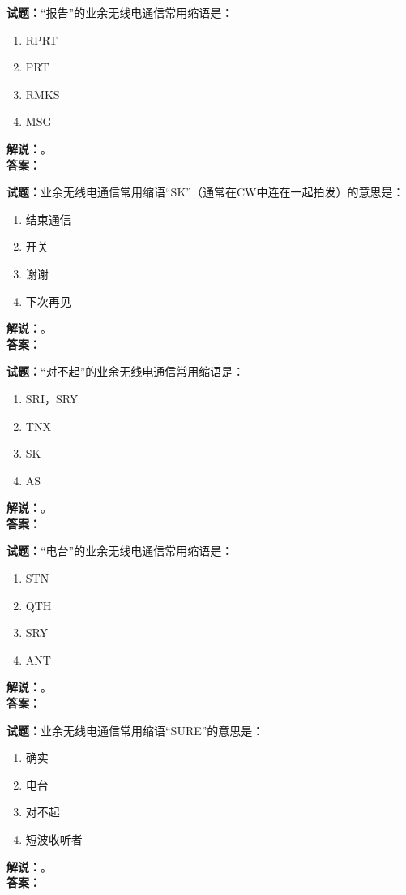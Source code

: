 \documentclass{ctexbook}
\begin{document}
\bigskip

\noindent\textbf{试题：}“报告”的业余无线电通信常用缩语是：
\begin{enumerate}[leftmargin=3em]
  \item RPRT
  \item PRT
  \item RMKS
  \item MSG
\end{enumerate}
\noindent\textbf{解说：}\textbf{}。\\\noindent\textbf{答案：}

\bigskip

\noindent\textbf{试题：}业余无线电通信常用缩语“SK”（通常在CW中连在一起拍发）的意思是：
\begin{enumerate}[leftmargin=3em]
  \item 结束通信
  \item 开关
  \item 谢谢
  \item 下次再见
\end{enumerate}
\noindent\textbf{解说：}\textbf{}。\\\noindent\textbf{答案：}

\bigskip

\noindent\textbf{试题：}“对不起”的业余无线电通信常用缩语是：
\begin{enumerate}[leftmargin=3em]
  \item SRI，SRY
  \item TNX
  \item SK
  \item AS
\end{enumerate}
\noindent\textbf{解说：}\textbf{}。\\\noindent\textbf{答案：}

\bigskip

\noindent\textbf{试题：}“电台”的业余无线电通信常用缩语是：
\begin{enumerate}[leftmargin=3em]
  \item STN
  \item QTH
  \item SRY
  \item ANT
\end{enumerate}
\noindent\textbf{解说：}\textbf{}。\\\noindent\textbf{答案：}

\bigskip

\noindent\textbf{试题：}业余无线电通信常用缩语“SURE”的意思是：
\begin{enumerate}[leftmargin=3em]
  \item 确实
  \item 电台
  \item 对不起
  \item 短波收听者
\end{enumerate}
\noindent\textbf{解说：}\textbf{}。\\\noindent\textbf{答案：}
\end{document}
